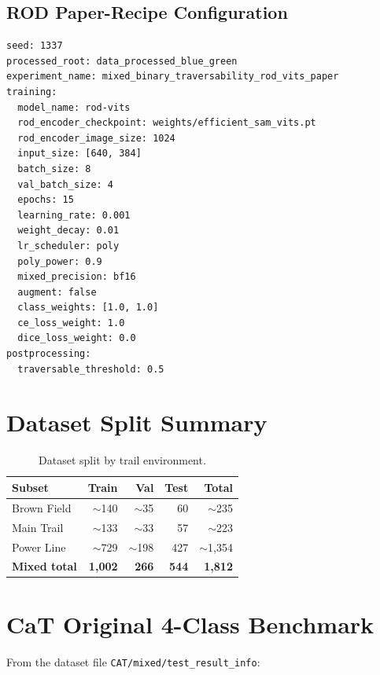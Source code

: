\documentclass[12pt,a4paper]{report}
\begin{document}
\section*{ROD Paper-Recipe Configuration}

\begin{verbatim}
seed: 1337
processed_root: data_processed_blue_green
experiment_name: mixed_binary_traversability_rod_vits_paper
training:
  model_name: rod-vits
  rod_encoder_checkpoint: weights/efficient_sam_vits.pt
  rod_encoder_image_size: 1024
  input_size: [640, 384]
  batch_size: 8
  val_batch_size: 4
  epochs: 15
  learning_rate: 0.001
  weight_decay: 0.01
  lr_scheduler: poly
  poly_power: 0.9
  mixed_precision: bf16
  augment: false
  class_weights: [1.0, 1.0]
  ce_loss_weight: 1.0
  dice_loss_weight: 0.0
postprocessing:
  traversable_threshold: 0.5
\end{verbatim}


\chapter{Dataset Split Summary}
\label{app:splits}

\begin{table}[H]
\centering
\caption{Dataset split by trail environment.}
\begin{tabular}{@{}lrrrr@{}}
\toprule
\textbf{Subset} & \textbf{Train} & \textbf{Val} & \textbf{Test} & \textbf{Total} \\
\midrule
Brown Field  & ${\sim}$140 & ${\sim}$35  & 60  & ${\sim}$235 \\
Main Trail   & ${\sim}$133 & ${\sim}$33  & 57  & ${\sim}$223 \\
Power Line   & ${\sim}$729 & ${\sim}$198 & 427 & ${\sim}$1{,}354 \\
\midrule
\textbf{Mixed total} & \textbf{1{,}002} & \textbf{266} & \textbf{544} & \textbf{1{,}812} \\
\bottomrule
\end{tabular}
\end{table}


\chapter{CaT Original 4-Class Benchmark}
\label{app:cat_benchmark}

From the dataset file \texttt{CAT/mixed/test\_result\_info}:
\end{document}
